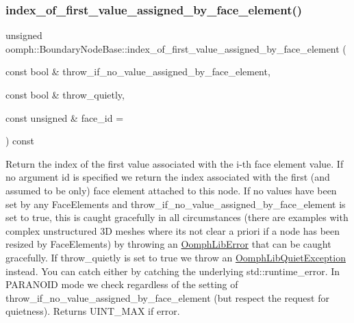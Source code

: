 \mbox{\label{classoomph_1_1BoundaryNodeBase_a1ff36a9e6c0894657a3ea61f1a4beeae}} 
\subsubsection{\texorpdfstring{index\+\_\+of\+\_\+first\+\_\+value\+\_\+assigned\+\_\+by\+\_\+face\+\_\+element()}{index\_of\_first\_value\_assigned\_by\_face\_element()}\hspace{0.1cm}{\footnotesize\ttfamily [2/2]}}
{\footnotesize\ttfamily unsigned oomph\+::\+Boundary\+Node\+Base\+::index\+\_\+of\+\_\+first\+\_\+value\+\_\+assigned\+\_\+by\+\_\+face\+\_\+element (\begin{DoxyParamCaption}\item[{const bool \&}]{throw\+\_\+if\+\_\+no\+\_\+value\+\_\+assigned\+\_\+by\+\_\+face\+\_\+element,  }\item[{const bool \&}]{throw\+\_\+quietly,  }\item[{const unsigned \&}]{face\+\_\+id = {} }\end{DoxyParamCaption}) const\hspace{0.3cm}{\ttfamily [inline]}}



Return the index of the first value associated with the i-\/th face element value. If no argument id is specified we return the index associated with the first (and assumed to be only) face element attached to this node. If no values have been set by any Face\+Elements and throw\+\_\+if\+\_\+no\+\_\+value\+\_\+assigned\+\_\+by\+\_\+face\+\_\+element is set to true, this is caught gracefully in all circumstances (there are examples with complex unstructured 3D meshes where it\textquotesingle{}s not clear a priori if a node has been resized by Face\+Elements) by throwing an \hyperlink{classoomph_1_1OomphLibError}{Oomph\+Lib\+Error} that can be caught gracefully. If throw\+\_\+quietly is set to true we throw an \hyperlink{classoomph_1_1OomphLibQuietException}{Oomph\+Lib\+Quiet\+Exception} instead. You can catch either by catching the underlying std\+::runtime\+\_\+error. In P\+A\+R\+A\+N\+O\+ID mode we check regardless of the setting of throw\+\_\+if\+\_\+no\+\_\+value\+\_\+assigned\+\_\+by\+\_\+face\+\_\+element (but respect the request for quietness). Returns U\+I\+N\+T\+\_\+\+M\+AX if error. 



